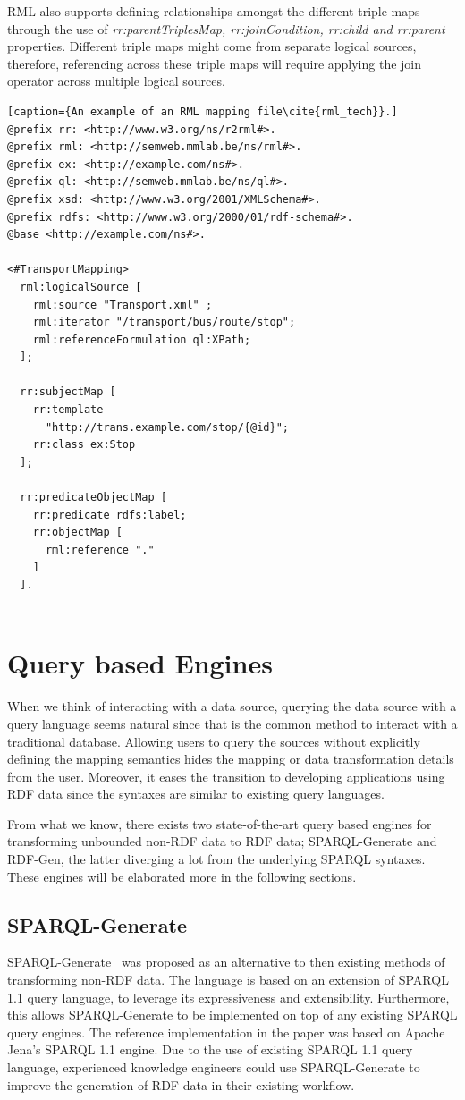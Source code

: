RML also supports defining relationships amongst the different 
triple maps through the use of \textit{rr:parentTriplesMap, rr:joinCondition, rr:child and rr:parent}
properties. Different triple maps might come from separate logical sources, therefore, 
referencing across these triple maps will require applying the join operator across multiple 
logical sources. 


\begin{lstlisting}[caption={An example of an RML mapping file\cite{rml_tech}}.]
@prefix rr: <http://www.w3.org/ns/r2rml#>.
@prefix rml: <http://semweb.mmlab.be/ns/rml#>.
@prefix ex: <http://example.com/ns#>.
@prefix ql: <http://semweb.mmlab.be/ns/ql#>.
@prefix xsd: <http://www.w3.org/2001/XMLSchema#>.
@prefix rdfs: <http://www.w3.org/2000/01/rdf-schema#>.
@base <http://example.com/ns#>.

<#TransportMapping>
  rml:logicalSource [
    rml:source "Transport.xml" ;
    rml:iterator "/transport/bus/route/stop";
    rml:referenceFormulation ql:XPath;
  ];

  rr:subjectMap [
    rr:template
      "http://trans.example.com/stop/{@id}";
    rr:class ex:Stop
  ];

  rr:predicateObjectMap [
    rr:predicate rdfs:label;
    rr:objectMap [
      rml:reference "."
    ]
  ].
    
\end{lstlisting}

\section{Query based Engines}
\label{sec:query_based_engine}
When we think of interacting with a data source, querying the data source with a 
query language seems natural since that is the common method to interact 
with a traditional database. Allowing users to query the sources without explicitly 
defining the mapping semantics hides the mapping or data transformation details from the user. 
Moreover, it eases the transition to developing applications using RDF data since the syntaxes are 
similar to existing query languages. 

From what we know, there exists two state-of-the-art query based engines for transforming 
unbounded non-RDF data to RDF data; SPARQL-Generate and RDF-Gen, the latter diverging a lot from
the underlying SPARQL syntaxes.  
These engines will be elaborated more in the following sections. 


\subsection{SPARQL-Generate}
SPARQL-Generate~\cite{sparql_generate} was proposed as an alternative to then existing methods of 
transforming non-RDF data. The language is based on an extension of SPARQL 1.1 query language, to leverage 
its expressiveness and extensibility. Furthermore, this allows SPARQL-Generate to be implemented on top 
of any existing SPARQL query engines. The reference implementation in the paper was based on Apache Jena's 
SPARQL 1.1 engine. Due to the use of existing SPARQL 1.1 query language, experienced knowledge engineers could use 
SPARQL-Generate to improve the generation of RDF data in their existing workflow. 

